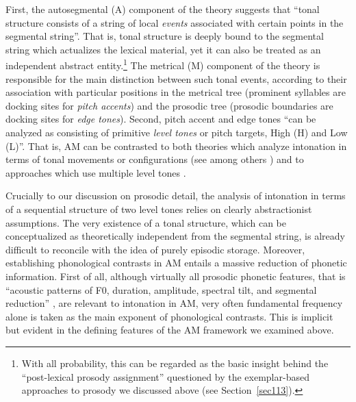 First, the autosegmental (A) component of the theory suggests that ``tonal structure consists of a string of local \textit{events} associated with certain points in the segmental string''. That is, tonal structure is deeply bound to the segmental string which actualizes the lexical material, yet it can also be treated as an independent abstract entity.\footnote{With all probability, this can be regarded as the basic insight behind the ``post-lexical prosody assignment'' questioned by the exemplar-based approaches to prosody we discussed above (see Section~\ref{sec113}).} The metrical (M) component of the theory is responsible for the main distinction between such tonal events, according to their association with particular positions in the metrical tree (prominent syllables are docking sites for \textit{pitch accents}) and the prosodic tree (prosodic boundaries are docking sites for \textit{edge tones}). Second, pitch accent and edge tones ``can be analyzed as consisting of primitive \textit{level tones} or pitch targets, High (H) and Low (L)''. That is, AM can be contrasted to both theories which analyze intonation in terms of tonal movements or configurations (see among others \citealt{bolinger1951intonation,delattre1966dix,isavcenko1970untersuchungen,tHart1990perceptual}) and to approaches which use multiple level tones \citep{pike1945intonation,wells1945pitch,trager1951outline}.

Crucially to our discussion on prosodic detail, the analysis of intonation in terms of a sequential structure of two level tones relies on clearly abstractionist assumptions. The very existence of a tonal structure, which can be conceptualized as theoretically independent from the segmental string, is already difficult to reconcile with the idea of purely episodic storage. Moreover, establishing phonological contrasts in AM entails a massive reduction of phonetic information. First of all, although virtually all prosodic phonetic features, that is ``acoustic patterns of F0, duration, amplitude, spectral tilt, and segmental reduction'' \citep{shattuck1996prosody}, are relevant to intonation in AM, very often fundamental frequency alone is taken as the main exponent of phonological contrasts. This is implicit but evident in the defining features of the AM framework we examined above.

